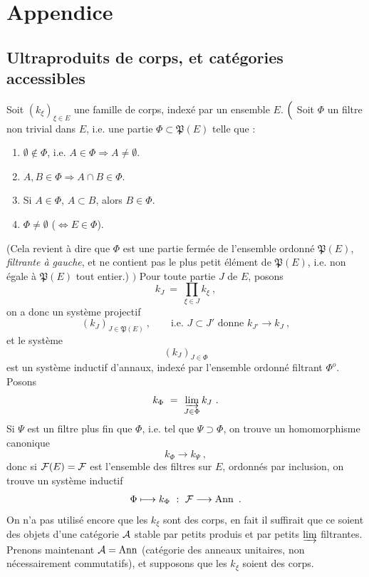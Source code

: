 \noindent



\section*{Appendice}

\subsection*{Ultraproduits de corps, et catégories accessibles}

\noindent Soit $(k_\xi)_{\xi\in E}$ une famille de corps, indexé par un ensemble $E$. $\Bigl($ Soit $\Phi$ un filtre non trivial dans $E$, i.e. une partie $\Phi\subset\mathfrak{P}(E)$ telle que :
\begin{enumerate}
\item[a)] $\emptyset\notin\Phi$, i.e. $A\in\Phi\Longrightarrow A\neq\emptyset$.
\item[b)] $A,B\in\Phi\Longrightarrow A\cap B\in\Phi$.
\item[c)] Si $A\in\Phi$, $A\subset B$, alors $B\in\Phi$.
\item[d)] $\Phi\neq\emptyset$ ($\iff E\in\Phi$).
\end{enumerate}
(Cela revient à dire que $\Phi$ est une partie fermée de l'ensemble ordonné $\mathfrak{P}(E)$, \textit{filtrante à gauche}, et ne contient pas le plus petit élément de $\mathfrak{P}(E)$, i.e. non égale à $\mathfrak{P}(E)$ tout entier.) $\Bigr)$ Pour toute partie $J$ de $E$, posons
\[
k_J \ = \ \prod_{\xi\in J} k_\xi \ ,
\]
on a donc un système projectif
\[
(k_J)_{J\in\mathfrak{P}(E)} \ , \qquad \text{i.e. } J\subset J' \text{ donne } k_{J'}\longrightarrow k_J \ ,
\]
et le système
\[
(k_J)_{J\in\Phi}
\]
est un système inductif d'annaux, indexé par l'ensemble ordonné filtrant $\Phi^o$. Posons %
\[
k_\Phi \ = \ \varinjlim_{J\in\Phi} k_J \ .
\]
Si $\Psi$ est un filtre plus fin que $\Phi$, i.e.
tel que $\Psi\supset\Phi$, on trouve un homomorphisme canonique
\[
k_\Phi \longrightarrow k_\Psi \ ,
\]
donc si $\mathcal{F}(E)=\mathcal{F}$ est l'ensemble des filtres sur $E$, ordonnés par inclusion, on trouve un système inductif
\[
\Phi \longmapsto k_\Phi \ : \ \mathcal{F} \longrightarrow \operatorname{Ann} \ .
\]
On n'a pas utilisé encore que les $k_\xi$ sont des corps, en fait il suffirait que ce soient des objets d'une catégorie $\mathcal{A}$ stable par petits produis et par petits $\varinjlim$ filtrantes. Prenons maintenant $\mathcal{A}=\operatorname{Ann}$ (catégorie des anneaux unitaires, non nécessairement commutatifs), et supposons que les $k_\xi$ soient des corps. %

